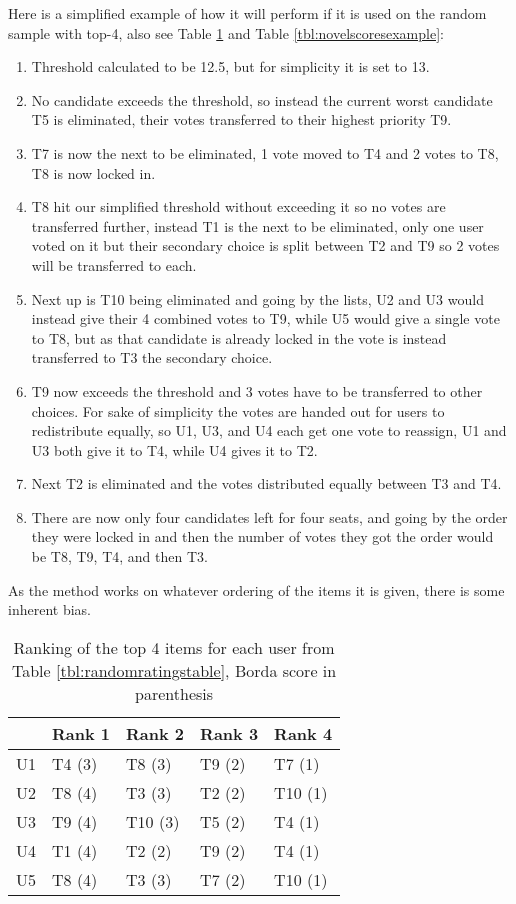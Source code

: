 Here is a simplified example of how it will perform if it is used on the random sample with top-4, also see Table \ref{tbl:top4borda} and Table \ref{tbl:novelscoresexample}:

\begin{enumerate}
	\item Threshold calculated to be 12.5, but for simplicity it is set to 13.
	\item No candidate exceeds the threshold, so instead the current worst candidate T5 is eliminated, their votes transferred to their highest priority T9.
	\item T7 is now the next to be eliminated, 1 vote moved to T4 and 2 votes to T8, T8 is now locked in.
	\item T8 hit our simplified threshold without exceeding it so no votes are transferred further, instead T1 is the next to be eliminated, only one user voted on it but their secondary choice is split between T2 and T9 so 2 votes will be transferred to each.
	\item Next up is T10 being eliminated and going by the lists, U2 and U3 would instead give their 4 combined votes to T9, while U5 would give a single vote to T8, but as that candidate is already locked in the vote is instead transferred to T3 the secondary choice.
	\item T9 now exceeds the threshold and 3 votes have to be transferred to other choices. For sake of simplicity the votes are handed out for users to redistribute equally, so U1, U3, and U4 each get one vote to reassign, U1 and U3 both give it to T4, while U4 gives it to T2.
	\item Next T2 is eliminated and the votes distributed equally between T3 and T4.
	\item There are now only four candidates left for four seats, and going by the order they were locked in and then the number of votes they got the order would be T8, T9, T4, and then T3.
\end{enumerate}

As the method works on whatever ordering of the items it is given, there is some inherent bias.

\begin{table}[H]
	\centering
	\begin{tabular}{l|l|l|l|l|}
		\cline{2-5}
		& Rank 1 & Rank 2 & Rank 3 & Rank 4 \\ \hline
		\multicolumn{1}{|l|}{U1} & T4 (3) & T8 (3) & T9 (2) & T7 (1) \\ \hline
		\multicolumn{1}{|l|}{U2} & T8 (4) & T3 (3) & T2 (2) & T10 (1) \\ \hline
		\multicolumn{1}{|l|}{U3} & T9 (4) & T10 (3) & T5 (2) & T4 (1) \\ \hline
		\multicolumn{1}{|l|}{U4} & T1 (4) & T2 (2) & T9 (2) & T4 (1) \\ \hline
		\multicolumn{1}{|l|}{U5} & T8 (4) & T3 (3) & T7 (2) & T10 (1) \\ \hline
	\end{tabular}
	\caption{Ranking of the top 4 items for each user from Table \ref{tbl:randomratingstable}, Borda score in parenthesis }
	\label{tbl:top4borda}
\end{table}

